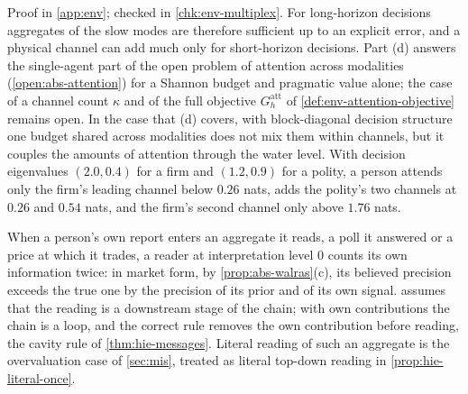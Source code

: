 Proof in \cref{app:env}; checked in \cref{chk:env-multiplex}. For long-horizon decisions aggregates of the slow modes are therefore sufficient up to an explicit error, and a physical channel can add much only for short-horizon decisions. Part (d) answers the single-agent part of the open problem of attention across modalities (\cref{open:abs-attention}) for a Shannon budget and pragmatic value alone; the case of a channel count $\kappa$ and of the full objective $G^{\mathrm{att}}_h$ of \cref{def:env-attention-objective} remains open. In the case that (d) covers, with block-diagonal decision structure one budget shared across modalities does not mix them within channels, but it couples the amounts of attention through the water level. With decision eigenvalues $(2.0,0.4)$ for a firm and $(1.2,0.9)$ for a polity, a person attends only the firm's leading channel below $0.26$ nats, adds the polity's two channels at $0.26$ and $0.54$ nats, and the firm's second channel only above $1.76$ nats.

\begin{remark}\label{rem:env-own-aggregate}
When a person's own report enters an aggregate it reads, a poll it answered or a price at which it trades, a reader at interpretation level 0 counts its own information twice: in market form, by \cref{prop:abs-walras}(c), its believed precision exceeds the true one by the precision of its prior and of its own signal.  assumes that the reading is a downstream stage of the chain; with own contributions the chain is a loop, and the correct rule removes the own contribution before reading, the cavity rule of \cref{thm:hie-messages}. Literal reading of such an aggregate is the overvaluation case of \cref{sec:mis}, treated as literal top-down reading in \cref{prop:hie-literal-once}.
\end{remark}

